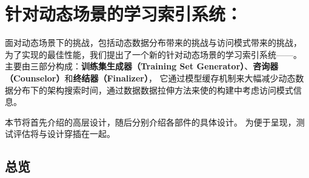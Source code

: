 \chapter{针对动态场景的学习索引系统：\sys}
\label{chap:sys}

面对动态场景下的挑战，包括动态数据分布带来的挑战与访问模式带来的挑战，
为了实现{\li}的最佳性能，我们提出了一个新的针对动态场景的学习索引系统{------}{\sys}。
{\sys}主要由三部分构成：\textbf{训练集生成器（Training Set Generator）}、\textbf{咨询器（Counselor）}和\textbf{终结器（Finalizer）}，
它通过模型缓存机制来大幅减少动态数据分布下的{\rmi}架构搜索时间，通过数据数据拉伸方法来使{\li}的构建中考虑访问模式信息。

本节将首先介绍{\sys}的高层设计，随后分别介绍{\sys}各部件的具体设计。
为便于呈现，测试评估将与设计穿插在一起。


\section{总览}

